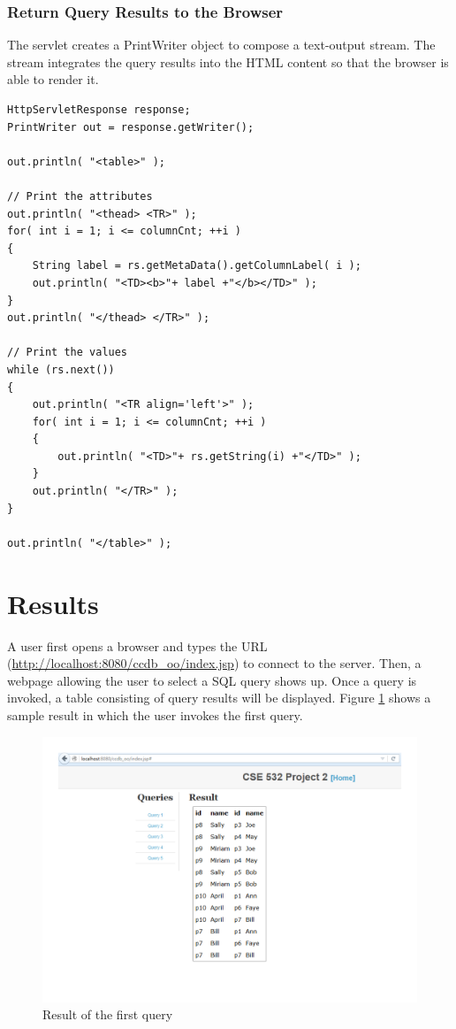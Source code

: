 \documentclass[11pt]{article}
\begin{document}
\subsubsection{Return Query Results to the Browser}
The servlet creates a PrintWriter object to compose a text-output stream. The stream integrates the query results into the HTML content so that the browser is able to render it.
\begin{verbatim}
HttpServletResponse response;
PrintWriter out = response.getWriter();

out.println( "<table>" );

// Print the attributes
out.println( "<thead> <TR>" );
for( int i = 1; i <= columnCnt; ++i )
{
    String label = rs.getMetaData().getColumnLabel( i );
    out.println( "<TD><b>"+ label +"</b></TD>" );
}
out.println( "</thead> </TR>" );

// Print the values
while (rs.next())
{
    out.println( "<TR align='left'>" );
    for( int i = 1; i <= columnCnt; ++i )
    {
        out.println( "<TD>"+ rs.getString(i) +"</TD>" );
    }
    out.println( "</TR>" );
}

out.println( "</table>" );
\end{verbatim}

\section{Results}
A user first opens a browser and types the URL (\url{http://localhost:8080/ccdb_oo/index.jsp}) to connect to the server. Then, a webpage allowing the user to select a SQL query shows up. Once a query is invoked, a table consisting of query results will be displayed. Figure \ref{fig:resultccdb} shows a sample result in which the user invokes the first query.

\begin{figure}[!htp]
\centering
\includegraphics[width=7in]{result.pdf}
\caption{Result of the first query}
\label{fig:resultccdb}
\end{figure}
\end{document}
